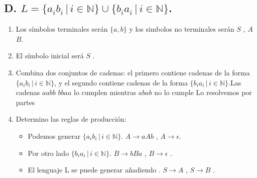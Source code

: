 \documentclass{article}
\begin{document}
        \newpage %
        \subsection*{D. $L = \{a_i b_i \,|\, i \in \mathbb{N}\} \cup \{b_i a_i \,|\, i \in \mathbb{N\}}$.}
        \begin{flushleft}
            \begin{enumerate}
                \item Los símbolos terminales serán $\{a,b\}$ y los simbolos no terminales serán $S$ , $A$ $B$.
                \item El símbolo inicial será $S$ .
                \item Combina dos conjuntos de cadenas: el primero contiene cadenas de la forma $\{a_i b_i \,|\, i \in \mathbb{N}\}$, y el segundo contiene cadenas de la forma $\{b_i a_i \,|\, i \in \mathbb{N}\}$.Las cadenas $aabb$ $bbaa$ lo cumplen mientras $abab$ no lo cumple Lo resolvemos por partes
                \item Determino las reglas de producción:
                
                \begin{itemize}
                    \item Podemos generar $\{a_i b_i \,|\, i \in \mathbb{N}\}. $
                        \subitem $A \rightarrow aAb$ , $A \rightarrow \epsilon$. 
                    \item Por otro lado $\{b_i a_i \,|\, i \in \mathbb{N}\}$.
                        \subitem $B \rightarrow bBa$ , $B \rightarrow \epsilon$ . 
                    \item El lenguaje L se puede generar añadiendo .
                        \subitem $S \rightarrow A$ , $S \rightarrow B$ . 
                \end{itemize}


\end{enumerate}
\end{flushleft}
\end{document}
